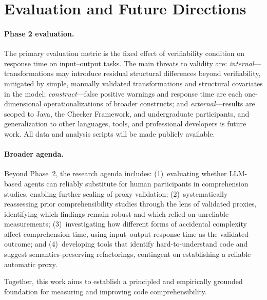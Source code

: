\documentclass[sigplan,10pt,anonymous=false]{acmart}
\begin{document}
\section{Evaluation and Future Directions}

\paragraph{Phase 2 evaluation.}
The primary evaluation metric is the fixed effect of verifiability condition on
response time on input--output tasks.
The main threats to validity are:
\textit{internal}---transformations may introduce residual structural
differences beyond verifiability, mitigated by simple, manually validated
transformations and structural covariates in the model;
\textit{construct}---false positive warnings and response time are each
one-dimensional operationalizations of broader constructs; and
\textit{external}---results are scoped to Java, the Checker Framework, and
undergraduate participants, and generalization to other languages, tools,
and professional developers is future work.
All data and analysis scripts will be made publicly available.

\paragraph{Broader agenda.}
Beyond Phase~2, the research agenda includes:
(1)~evaluating whether LLM-based agents can reliably substitute for human
participants in comprehension studies, enabling further scaling of proxy
validation;
(2)~systematically reassessing prior comprehensibility studies through the
lens of validated proxies, identifying which findings remain robust and which
relied on unreliable measurements;
(3)~investigating how different forms of accidental
complexity~\cite{brooks1987no} affect comprehension time, using input--output
response time as the validated outcome; and
(4)~developing tools that identify hard-to-understand code and suggest
semantics-preserving refactorings, contingent on establishing a reliable
automatic proxy.

Together, this work aims to establish a principled and empirically grounded
foundation for measuring and improving code comprehensibility.




\end{document}
